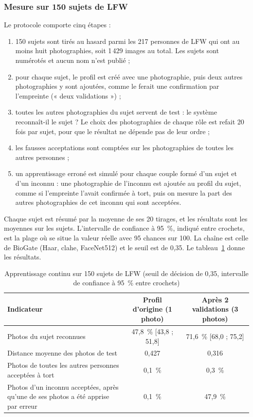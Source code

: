 \subsubsection{Mesure sur 150 sujets de LFW}\label{sec:lfw}

\begin{maj}
Le protocole comporte cinq étapes :
\begin{enumerate}
  \item 150 sujets sont tirés au hasard parmi les 217 personnes de LFW qui ont au moins huit photographies, soit 1\,429 images au total. Les sujets sont numérotés et aucun nom n'est publié ;
  \item pour chaque sujet, le profil est créé avec une photographie, puis deux autres photographies y sont ajoutées, comme le ferait une confirmation par l'empreinte (« deux validations ») ;
  \item toutes les autres photographies du sujet servent de test : le système reconnaît-il le sujet ? Le choix des photographies de chaque rôle est refait 20 fois par sujet, pour que le résultat ne dépende pas de leur ordre ;
  \item les fausses acceptations sont comptées sur les photographies de toutes les autres personnes ;
  \item un apprentissage erroné est simulé pour chaque couple formé d'un sujet et d'un inconnu : une photographie de l'inconnu est ajoutée au profil du sujet, comme si l'empreinte l'avait confirmée à tort, puis on mesure la part des autres photographies de cet inconnu qui sont acceptées.
\end{enumerate}
Chaque sujet est résumé par la moyenne de ses 20 tirages, et les résultats sont les moyennes sur les sujets. L'intervalle de confiance à 95~\%, indiqué entre crochets, est la plage où se situe la valeur réelle avec 95 chances sur 100. La chaîne est celle de BioGate (Haar, \gls{clahe}, FaceNet512) et le seuil est de 0,35. Le tableau~\ref{tab:lfwappr} donne les résultats.
\end{maj}

\begin{table}[H]
\centering
\caption{Apprentissage continu sur 150 sujets de LFW (seuil de décision de 0,35, intervalle de confiance à 95~\% entre crochets)}\majmark\label{tab:lfwappr}
\small
\begin{tabularx}{\textwidth}{@{}>{\raggedright\arraybackslash}Xcc@{}}
\toprule
\textbf{Indicateur} & \textbf{Profil d'origine (1 photo)} & \textbf{Après 2 validations (3 photos)} \\
\midrule
Photos du sujet reconnues & 47,8~\% [43,8 ; 51,8] & 71,6~\% [68,0 ; 75,2] \\
Distance moyenne des photos de test & 0,427 & 0,316 \\
Photos de toutes les autres personnes acceptées à tort & 0,1~\% & 0,3~\% \\
Photos d'un inconnu acceptées, après qu'une de ses photos a été apprise par erreur & 0,1~\% & 47,9~\% \\
\bottomrule
\end{tabularx}
\end{table}

